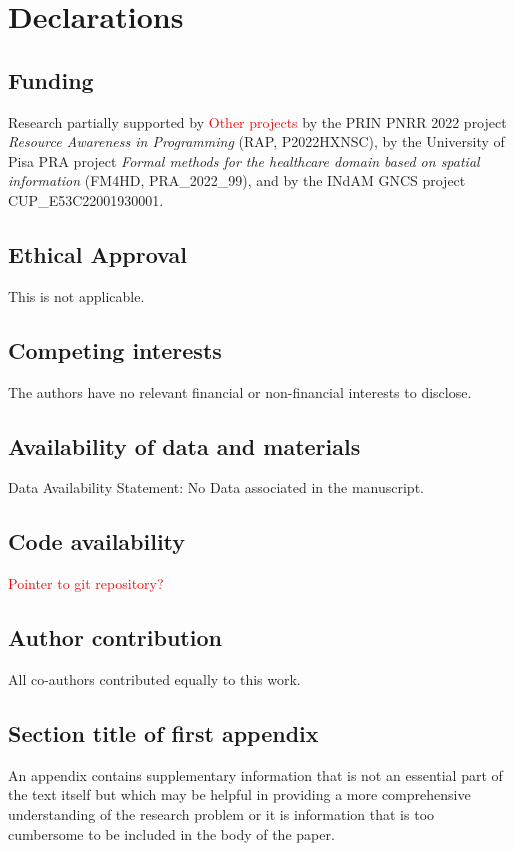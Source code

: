 \documentclass[sn-mathphys-num,a4paper,iicol,lineno,pdflatex]{sn-jnl-hacked}
\theoremstyle{thmstyleone}%
\theoremstyle{thmstyletwo}%
\theoremstyle{thmstylethree}%
\begin{document}

\section*{Declarations}

\subsection*{Funding}

Research partially supported 
by \textcolor{red}{Other projects}
by the PRIN PNRR 2022 project \emph{Resource Awareness in Programming} (RAP, P2022HXNSC),
by the University of Pisa PRA project \emph{Formal methods for the healthcare domain based on spatial information} (FM4HD, PRA\_2022\_99),
and by the INdAM GNCS project CUP\_E53C22001930001.

\subsection*{Ethical Approval}
This is not applicable.
 
\subsection*{Competing interests}
The authors have no relevant financial or non-financial interests to disclose.

\subsection*{Availability of data and materials}
Data Availability Statement: No Data associated in the manuscript.

\subsection*{Code availability}

\textcolor{red}{Pointer to git repository?}

\subsection*{Author contribution}

All co-authors contributed equally to this work.

\begin{appendices}

\section{Section title of first appendix}

An appendix contains supplementary information that is not an essential part of the text itself but which may be helpful in providing a more comprehensive understanding of the research problem or it is information that is too cumbersome to be included in the body of the paper.

\end{appendices}



\end{document}
